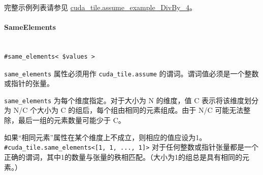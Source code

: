 \documentclass{article}
\begin{document}
完整示例列表请参见 \href{https://docs.nvidia.com/cuda/tile-ir/latest/sections/appendix.html#example-cuda-tile-assume-example-divby-4}{cuda\_tile.assume\_example\_DivBy\_4}。





\paragraph{SameElements}


\begin{lstlisting}

#same_elements< $values >

\end{lstlisting}



\texttt{same\_elements} 属性必须用作 \texttt{cuda\_tile.assume} 的谓词。谓词值必须是一个整数或指针的张量。



\texttt{same\_elements} 为每个维度指定。对于大小为 N 的维度，值 C 表示将该维度划分为 N/C 个大小为 C 的组后，每个组由相同的元素组成。由于 N/C 可能无法整除，最后一组的元素数量可能少于 C。



如果``相同元素''属性在某个维度上不成立，则相应的值应设为1。\texttt{\#cuda\_tile.same\_elements<[1, 1, ..., 1]>} 对于任何整数或指针张量都是一个正确的谓词，其中1的数量与张量的秩相匹配。（大小为1的组总是具有相同的元素。）
\end{document}
